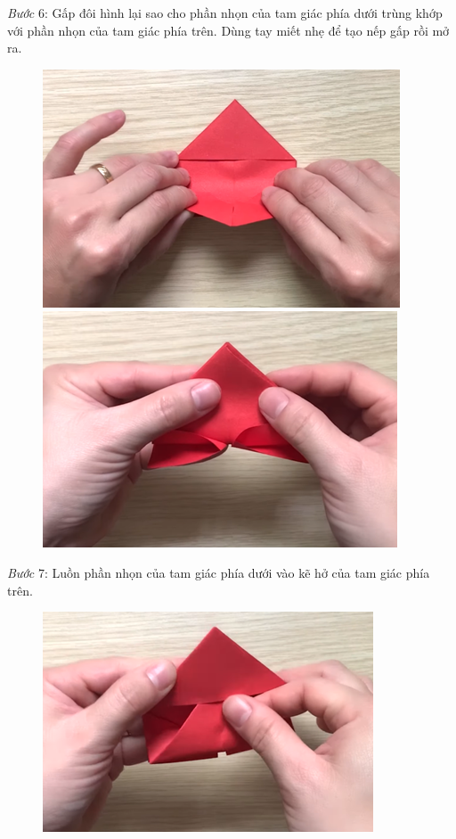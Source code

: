 \begin{multicols}{2}
\begin{figure}[H]
	\end{figure}
	\textit{Bước} $6$: Gấp đôi hình lại sao cho phần nhọn của tam giác phía dưới trùng khớp với phần nhọn của tam giác phía trên. Dùng tay miết nhẹ để tạo nếp gấp rồi mở ra.
	\begin{figure}[H]
		\vspace*{-5pt}
		\centering
		\captionsetup{labelformat= empty, justification=centering}
		\includegraphics[width=0.65\linewidth]{31}
		
		\vspace*{1pt}
		\includegraphics[width=0.65\linewidth]{32}
		\vspace*{-10pt}
	\end{figure}
	\textit{Bước} $7$: Luồn phần nhọn của tam giác phía dưới vào kẽ hở của tam giác phía trên.
	\begin{figure}[H]
		\vspace*{-5pt}
		\centering
		\captionsetup{labelformat= empty, justification=centering}
		\includegraphics[width=0.65\linewidth]{33}
		

\end{figure}
\end{multicols}
